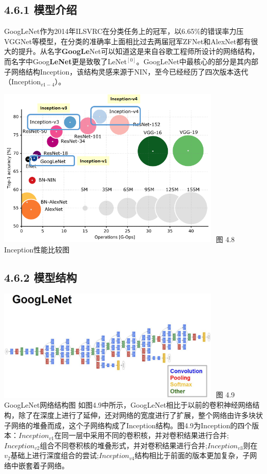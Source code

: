 \subsection{4.6.1 模型介绍}\label{ux6a21ux578bux4ecbux7ecd-5}

​
GoogLeNet作为2014年ILSVRC在分类任务上的冠军，以6.65\%的错误率力压VGGNet等模型，在分类的准确率上面相比过去两届冠军ZFNet和AlexNet都有很大的提升。从名字\textbf{GoogLe}Net可以知道这是来自谷歌工程师所设计的网络结构，而名字中Goog\textbf{LeNet}更是致敬了LeNet\(^{[0]}\)。GoogLeNet中最核心的部分是其内部子网络结构Inception，该结构灵感来源于NIN，至今已经经历了四次版本迭代（Inception\(_{v1-4}\)）。

\includegraphics[width=0.8\textwidth]{./img/ch4/img_inception_01.png} ​ 图 4.8
Inception性能比较图

\subsection{4.6.2 模型结构}\label{ux6a21ux578bux7ed3ux6784-5}

\includegraphics[width=0.8\textwidth]{./img/ch4/image25.jpeg} ​ 图 4.9 GoogLeNet网络结构图 ​
如图4.9中所示，GoogLeNet相比于以前的卷积神经网络结构，除了在深度上进行了延伸，还对网络的宽度进行了扩展，整个网络由许多块状子网络的堆叠而成，这个子网络构成了Inception结构。图4.9为Inception的四个版本：\(Inception_{v1}​\)在同一层中采用不同的卷积核，并对卷积结果进行合并;\(Inception_{v2}​\)组合不同卷积核的堆叠形式，并对卷积结果进行合并;\(Inception_{v3}​\)则在\(v_2​\)基础上进行深度组合的尝试;\(Inception_{v4}​\)结构相比于前面的版本更加复杂，子网络中嵌套着子网络。

